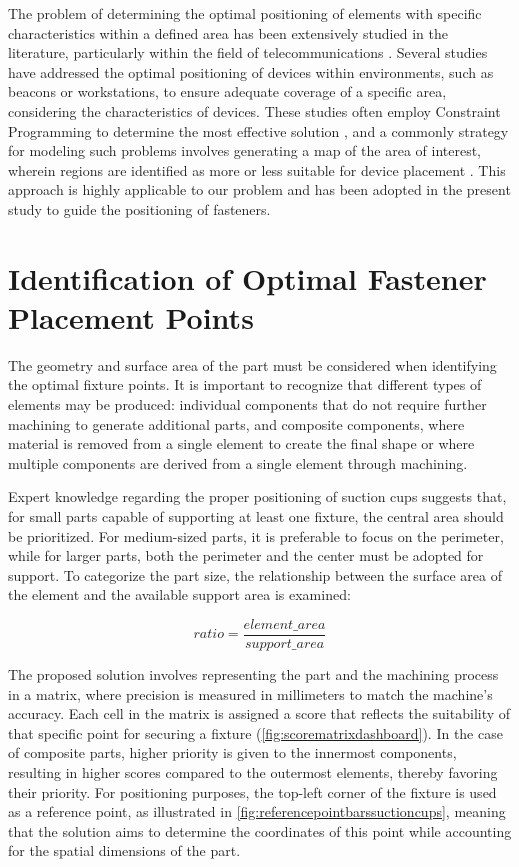 \documentclass[runningheads]{llncs}
\begin{document}
The problem of determining the optimal positioning of elements with specific characteristics within a defined area has been extensively studied in the literature, particularly within the field of telecommunications \cite{younis2008strategies}. Several studies have addressed the optimal positioning of devices within environments, such as beacons or workstations, to ensure adequate coverage of a specific area, considering the characteristics of devices. These studies often employ Constraint Programming to determine the most effective solution \cite{loffler2022optimal,fruhwirth1998optimal}, and a commonly strategy for modeling such problems involves generating a map of the area of interest, wherein regions are identified as more or less suitable for device placement \cite{loffler2022optimal,fruhwirth1998optimal,vlasenko2014smart}. This approach is highly applicable to our problem and has been adopted in the present study to guide the positioning of fasteners.


\section{Identification of Optimal Fastener Placement Points}

The geometry and surface area of the part must be considered when identifying the optimal fixture points. It is important to recognize that different types of elements may be produced: individual components that do not require further machining to generate additional parts, and composite components, where material is removed from a single element to create the final shape or where multiple components are derived from a single element through machining.

Expert knowledge regarding the proper positioning of suction cups suggests that, for small parts capable of supporting at least one fixture, the central area should be prioritized. For medium-sized parts, it is preferable to focus on the perimeter, while for larger parts, both the perimeter and the center must be adopted for support. To categorize the part size, the relationship between the surface area of the element and the available support area is examined:

\[
	ratio  = \frac{element\_area}{support\_area} 
\]

The proposed solution involves representing the part and the machining process in a matrix, where precision is measured in millimeters to match the machine's accuracy. Each cell in the matrix is assigned a score that reflects the suitability of that specific point for securing a fixture (\cref{fig:scorematrixdashboard}). In the case of composite parts, higher priority is given to the innermost components, resulting in higher scores compared to the outermost elements, thereby favoring their priority. For positioning purposes, the top-left corner of the fixture is used as a reference point, as illustrated in \cref{fig:referencepointbarssuctioncups}, meaning that the solution aims to determine the coordinates of this point while accounting for the spatial dimensions of the part.
\end{document}

